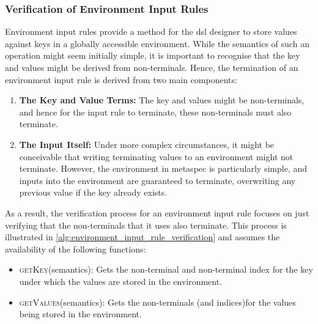 \subsubsection{Verification of Environment Input Rules} %
\label{ssub:verification_of_environment_input_rules}
Environment input rules provide a method for the \gls{dsl} designer to store values against keys in a globally accessible environment. 
While the semantics of such an operation might seem initially simple, it is important to recognise that the key and values might be derived from non-terminals.
Hence, the termination of an environment input rule is derived from two main components:
\begin{enumerate}
    \item \textbf{The Key and Value Terms:} The key and values might be non-terminals, and hence for the input rule to terminate, these non-terminals must also terminate.
    \item \textbf{The Input Itself:} Under more complex circumstances, it might be conceivable that writing terminating values to an environment might not terminate.
    However, the environment in \gls{metaspec} is particularly simple, and inputs into the environment are guaranteed to terminate, overwriting any previous value if the key already exists.
\end{enumerate}

As a result, the verification process for an environment input rule focuses on just verifying that the non-terminals that it uses also terminate.
This process is illustrated in \autoref{alg:environment_input_rule_verification} and assumes the availability of the following functions:
\begin{itemize}
    \item \textsc{getKey}(semantics): Gets the non-terminal and non-terminal index for the key under which the values are stored in the environment.
    \item \textsc{getValues}(semantics): Gets the non-terminals (and indices)for the values being stored in the environment.
\end{itemize}

